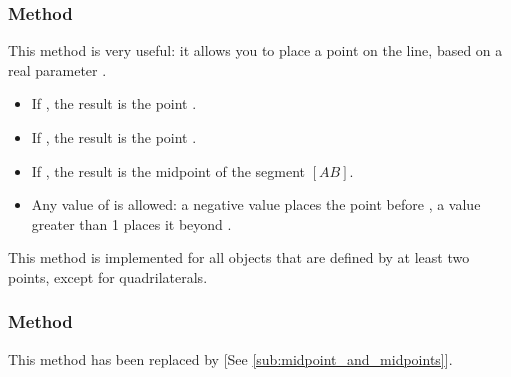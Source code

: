 \subsubsection{Method  }%
\label{ssub:method_point}

This method is very useful: it allows you to place a point on the line, based on a real parameter .

\begin{itemize}
  \item If , the result is the point .
  \item If , the result is the point .
  \item If , the result is the midpoint of the segment $[AB]$.
  \item Any value of  is allowed: a negative value places the point before , a value greater than 1 places it beyond .
\end{itemize}

This method is implemented for all objects that are defined by at least two points, except for quadrilaterals.


\begin{minipage}{.5\textwidth}
\begin{center}
\end{center}
\end{minipage}
\begin{minipage}{.5\textwidth}
\begin{tkzexample}
\end{tkzexample}
\end{minipage}

\subsubsection{Method }
\label{ssub:method_line_midpoint}

This method has been replaced by  [See \ref{sub:midpoint_and_midpoints}].

